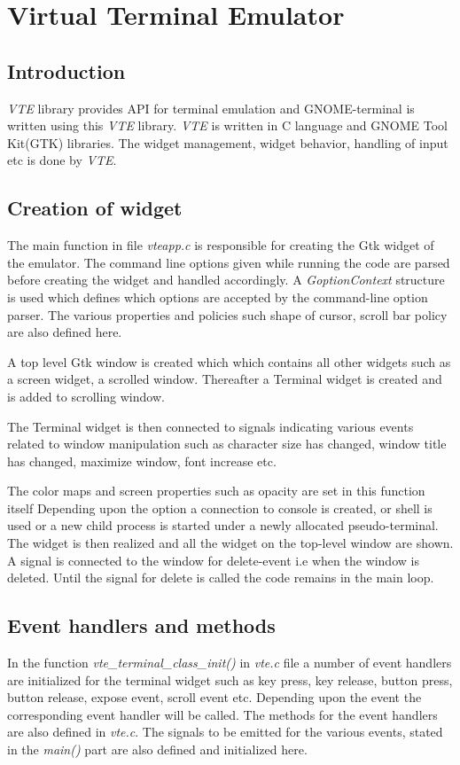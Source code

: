 \chapter{Virtual Terminal Emulator}
\section{Introduction}
\textit{VTE} library provides API for terminal emulation and GNOME-terminal is written using this \textit{VTE} library. \textit{VTE} is written in C language and GNOME Tool Kit(GTK) libraries. The widget management, widget behavior, handling of input etc is done by \textit{VTE}.

\section{Creation of widget}
The main function in file \textit{vteapp.c} is responsible for creating the Gtk widget of the emulator.
The command line options given while running the code are parsed before creating the widget and handled accordingly. A \textit{GoptionContext} structure is used which defines which options are accepted by the command-line option parser. The various properties and policies such shape of cursor, scroll bar policy are also defined here. 

A top level Gtk window is created which which contains all other widgets such as a screen widget, a scrolled window. Thereafter a Terminal widget is created and is added to scrolling window.

The Terminal widget is then connected to signals indicating various events related to window manipulation such as character size has changed, window title has changed, maximize window, font increase etc. 

The color maps and screen properties such as opacity are set in this function itself Depending upon the option a connection to console is created, or shell is used or a new child  process is started under a newly allocated pseudo-terminal. The widget is then realized and all the widget on the top-level window are shown. A signal is connected to the window for delete-event i.e when the window is deleted. Until the signal for delete is called the code remains in the main loop.

\section{Event handlers and methods}
In the function \textit{vte\_terminal\_class\_init()} in \textit{vte.c} file a number of event handlers are initialized for the terminal widget such as key press, key release, button press, button release, expose event, scroll event etc. Depending upon the event the corresponding event handler will be called. The methods for the event handlers are also defined in \textit{vte.c}. The signals  to be emitted for the various events, stated in the \textit{main()} part are also defined and initialized here.

